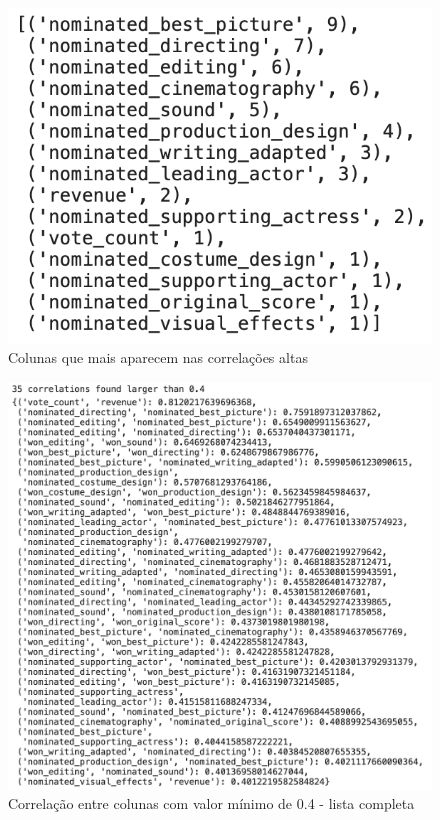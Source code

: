             \begin{figure}[htb]
            	\caption{\label{colunas_influentes}Colunas que mais aparecem nas correlações altas}
            	\begin{center}
            		\includegraphics[scale=0.7]{colunas_influentes.png}
            	\end{center}
            \end{figure}

            \begin{figure}[htb]
            	\caption{\label{corrs0.4}Correlação entre colunas com valor mínimo de 0.4 - lista completa}
            	\begin{center}
            		\includegraphics[scale=0.7]{corrs0.4.png}
            	\end{center}
            \end{figure}

